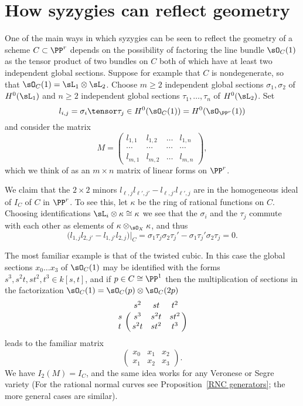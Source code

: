 
\section{How syzygies can reflect geometry}\label{syzy and geom}

One of the main ways in which syzygies can be seen to reflect the geometry of a scheme $C\subset \PP^r$
depends on the possibility of factoring the line bundle $\sO_C(1)$ as the tensor product of two bundles on $C$
both of which have at least two independent global sections. Suppose for example that $C$ is nondegenerate, 
so that  $\sO_C(1) = \sL_1\otimes \sL_2$. Choose $m\geq 2$ independent global sections
$\sigma_1, \sigma_2$ of  $H^0(\sL_1)$ and $n\geq 2$ independent global sections $\tau_1,\dots, \tau_n$ of $H^0(\sL_2)$. Set
$$
l_{i,j}= \sigma_i\tensor \tau_j \in H^0(\sO_C(1)) = H^0(\sO_{\PP^r}(1))
$$ and consider the matrix 
$$
M = 
\begin{pmatrix}
 l_{1,1}&l_{1,2}&\dots&l_{1,n}\\
 \cdots&\cdots&\cdots&\cdots\\
  l_{m,1}&l_{m,2}&\dots&l_{m,n}
\end{pmatrix},
$$
which we think of as an $m\times n$ matrix of linear forms on $\PP^r$.

We claim that  the $2\times 2$ minors $l_{\ell,j} l_{\ell',j'}-l_{\ell,j'} l_{\ell',j}$ are in the homogeneous ideal of $I_C$ of $C$ in $\PP^r$. 
To see this,
let $\kappa$ be the ring of rational functions on $C$. Choosing identifications $\sL_i\otimes \kappa  \cong \kappa $ we see that the $\sigma_i$ and the $\tau_j$ commute with each other as elements of $\kappa  \otimes_{\sO_X} \kappa $, and thus 
$$
\bigl(l_{1,j} l_{2,j'}-l_{1,j'}l_{2,j}\bigr)|_C = \sigma_1\tau_j\sigma_2\tau_j' - \sigma_1\tau_j'\sigma_2\tau_j =0.
$$

\begin{example}
The most familiar example is that of the twisted cubic. In this case the global sections $x_0\dots x_3$ of $\sO_C(1)$ may be identified with the forms $s^3, s^2t, st^2, t^3 \in k[s,t]$, and if $p\in C \cong \PP^1$ then the multiplication of sections
in the factorization  $\sO_C(1) = \sO_C(p) \otimes \sO_C(2p)$ 
$$
\bordermatrix{
 &s^2&st&t^2\cr
 s& s^3&s^2t&st^2\cr
 t& s^2t&st^2&t^3
}
$$
 leads to the familiar matrix
$$
\begin{pmatrix}
x_0&x_1&x_2\\
x_1&x_2&x_3 
\end{pmatrix}.
$$
We have $I_2(M) = I_C$, and the same idea works for any Veronese or Segre variety (For the rational normal curves see Proposition~\ref{RNC generators}; the more general cases are similar).
\end{example}

